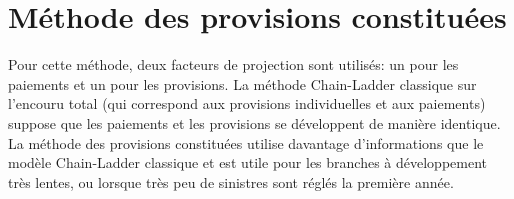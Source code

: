 \section{Méthode des provisions constituées}
\label{sec:deterministe:provisions-constituees}

Pour cette méthode, deux facteurs de projection sont utilisés: un pour
les paiements et un pour les provisions. La méthode Chain-Ladder
classique sur l'encouru total (qui correspond aux provisions
individuelles et aux paiements) suppose que les paiements et les
provisions se développent de manière identique. La méthode des
provisions constituées utilise davantage d'informations que le modèle
Chain-Ladder classique et est utile pour les branches à développement
très lentes, ou lorsque très peu de sinistres sont réglés la première
année.

